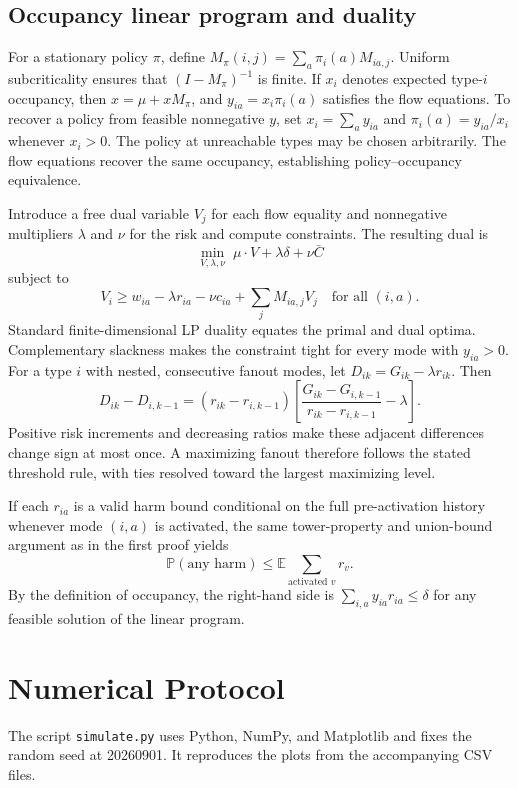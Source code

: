 \documentclass[sigconf,nonacm]{acmart}
\newcommand{\E}{\mathbb{E}}
\newcommand{\Prb}{\mathbb{P}}
\begin{document}
\subsection{Occupancy linear program and duality}

For a stationary policy $\pi$, define
$M_\pi(i,j)=\sum_a\pi_i(a)M_{ia,j}$.  Uniform subcriticality ensures that
$(I-M_\pi)^{-1}$ is finite.  If $x_i$ denotes expected type-$i$ occupancy, then
$x=\mu+xM_\pi$, and $y_{ia}=x_i\pi_i(a)$ satisfies the flow equations.  To recover a policy from
feasible nonnegative $y$, set $x_i=\sum_a y_{ia}$ and
$\pi_i(a)=y_{ia}/x_i$ whenever $x_i>0$.  The policy at unreachable types may be chosen
arbitrarily.  The flow equations recover the same occupancy, establishing policy--occupancy
equivalence.

Introduce a free dual variable $V_j$ for each flow equality and nonnegative multipliers $\lambda$
and $\nu$ for the risk and compute constraints.  The resulting dual is
\[
 \min_{V,\lambda,\nu}\;\mu\!\cdot\!V+\lambda\delta+\nu\bar C
\]
subject to
\[
 V_i\geq w_{ia}-\lambda r_{ia}-\nu c_{ia}+\sum_jM_{ia,j}V_j
 \quad\text{for all }(i,a).
\]
Standard finite-dimensional LP duality equates the primal and dual optima.  Complementary
slackness makes the constraint tight for every mode with $y_{ia}>0$.  For a type $i$ with nested,
consecutive fanout modes, let $D_{ik}=G_{ik}-\lambda r_{ik}$.  Then
\[
D_{ik}-D_{i,k-1}
=(r_{ik}-r_{i,k-1})
\left[
\frac{G_{ik}-G_{i,k-1}}{r_{ik}-r_{i,k-1}}-\lambda
\right].
\]
Positive risk increments and decreasing ratios make these adjacent differences change sign at
most once.  A maximizing fanout therefore follows the stated threshold rule, with ties resolved
toward the largest maximizing level.

If each $r_{ia}$ is a valid harm bound conditional on the full pre-activation history whenever
mode $(i,a)$ is activated, the same tower-property and union-bound argument as in the first proof yields
\[
 \Prb(\text{any harm})\leq\E\!\sum_{\text{activated }v}r_v.
\]
By the definition of occupancy, the right-hand side is
$\sum_{i,a}y_{ia}r_{ia}\leq\delta$ for any feasible solution of the linear program.

\section{Numerical Protocol}

The script \texttt{simulate.py} uses Python, NumPy, and Matplotlib and fixes the random seed at
20260901.  It reproduces the plots from the accompanying CSV files.
\end{document}
